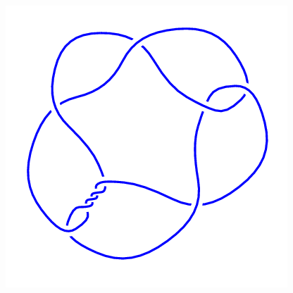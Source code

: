 \begin{figure}[H]
\begin{minipage}[b]{.18\linewidth}
    \end{minipage}
    \begin{minipage}[b]{.18\linewidth}
        \centering
        \includegraphics[width=\linewidth]{../data/10_6.png}
    \end{minipage}
\end{figure}
